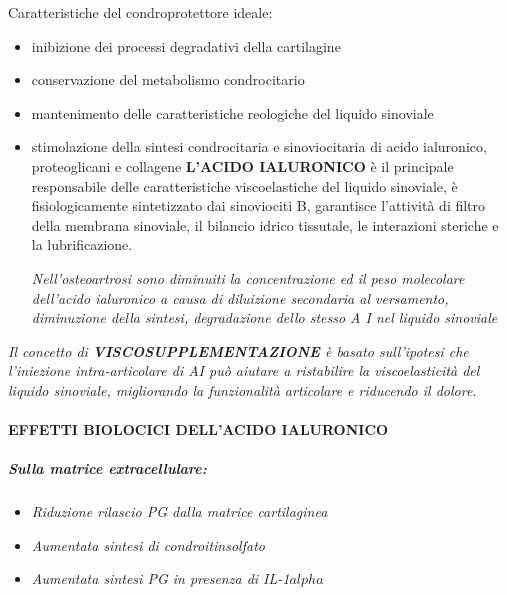 Caratteristiche del condroprotettore ideale:

\begin{itemize}
\item
  
  inibizione dei processi degradativi della cartilagine
  
\item
  
  conservazione del metabolismo condrocitario
  
\item
  
  mantenimento delle caratteristiche reologiche del liquido sinoviale
  
\item
  stimolazione della sintesi condrocitaria e sinoviocitaria di acido
  ialuronico, proteoglicani e collagene \textbf{L'ACIDO IALURONICO} è il
  principale responsabile delle caratteristiche viscoelastiche del
  liquido sinoviale, è fisiologicamente sintetizzato dai sinoviociti B,
  garantisce l'attività di filtro della membrana sinoviale, il bilancio
  idrico tissutale, le interazioni steriche e la lubrificazione.
  
  \emph{Nell'osteoartrosi sono diminuiti la concentrazione ed il peso
molecolare dell'acido ialuronico a causa di diluizione secondaria al
versamento, diminuzione della sintesi, degradazione dello stesso A I nel
liquido sinoviale}

\end{itemize}




\emph{Il concetto di \textbf{VISCOSUPPLEMENTAZIONE} è basato
sull'ipotesi che l'iniezione intra-articolare di AI può aiutare a ristabilire la viscoelasticità del liquido
sinoviale, migliorando la funzionalità articolare e riducendo il
dolore.}

\paragraph{EFFETTI BIOLOCICI DELL'ACIDO IALURONICO}
\subparagraph{Sulla matrice extracellulare:}


\begin{itemize}
\item
  
  \emph{Riduzione rilascio PG dalla matrice cartilaginea}
  
\item
  
  \emph{Aumentata sintesi di condroitinsolfato}
  
\item
  
  \emph{Aumentata sintesi PG in presenza di IL-1$alpha$}
  
\end{itemize}

